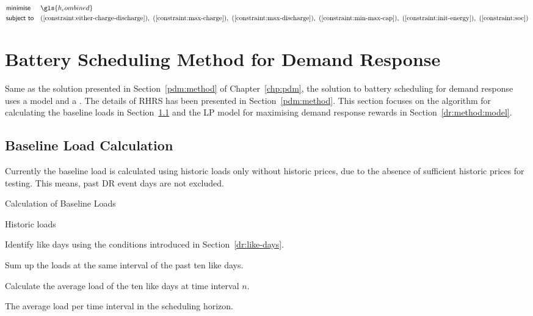 \begin{equation*}
	\label{dr:problem:formulation}
	\begin{aligned}
		& {\textsf{minimise}}
		& &  \gls{h_combined}   \\
		& \textsf{subject to}
		& & 
		(\ref{constraint:either-charge-discharge}), 
		~(\ref{constraint:max-charge}), 
		~(\ref{constraint:max-discharge}), 
		~(\ref{constraint:min-max-cap}), 
		~(\ref{constraint:init-energy}), 
		~(\ref{constraint:soc})\\
	\end{aligned}
\end{equation*}

\section{Battery Scheduling Method for Demand Response}
\label{dr:method}

Same as the solution presented in Section~\ref{pdm:method} of Chapter~\ref{chp:pdm}, the solution to battery scheduling for demand response uses a  model and a . The details of \gls{RHRS} has been presented in Section~\ref{pdm:method}.  This section focuses on the algorithm for calculating the baseline loads in Section~\ref{dr:method:baseline} and the \gls{LP} model for maximising demand response rewards in Section~\ref{dr:method:model}. 

\subsection{Baseline Load Calculation}
\label{dr:method:baseline}

Currently the baseline load is calculated using historic loads only without historic prices, due to the absence of sufficient historic prices for testing. This means, past \gls{DR} event days are not excluded. 

\begin{algorithm}[tbh]
		\caption{Calculation of Baseline Loads}
		\label{single:alg:ogs} 
		\begin{algorithmic}[1]
		
				\Require Historic loads %
				
				
					\State Identify like days using the conditions introduced in Section~\ref{dr:like-days}. 
					
					\State  Sum up the loads at the same interval of the past ten like days. 
					
					\State Calculate the average load of the ten like days at time interval $n$. 
				
				\EndFor
							
				\Ensure The average load per time interval in the scheduling horizon. 
			\end{algorithmic}
	\end{algorithm}


